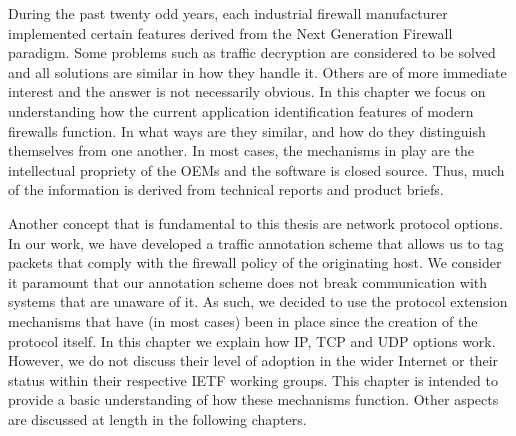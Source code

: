 During the past twenty odd years, each industrial firewall manufacturer
implemented certain features derived from the Next Generation Firewall paradigm.
Some problems such as traffic decryption are considered to be solved and all
solutions are similar in how they handle it. Others are of more immediate interest
and the answer is not necessarily obvious. In this chapter we focus on
understanding how the current application identification features of modern
firewalls function. In what ways are they similar, and how do they distinguish
themselves from one another. In most cases, the mechanisms in play are the
intellectual propriety of the OEMs and the software is closed source. Thus, much
of the information is derived from technical reports and product briefs.

Another concept that is fundamental to this thesis are network protocol options.
In our work, we have developed a traffic annotation scheme that allows us to
tag packets that comply with the firewall policy of the originating host. We
consider it paramount that our annotation scheme does not break communication
with systems that are unaware of it. As such, we decided to use the protocol
extension mechanisms that have (in most cases) been in place since the creation
of the protocol itself. In this chapter we explain how IP, TCP and UDP options
work. However, we do not discuss their level of adoption in the wider Internet
or their status within their respective IETF working groups. This chapter is
intended to provide a basic understanding of how these mechanisms function.
Other aspects are discussed at length in the following chapters.

